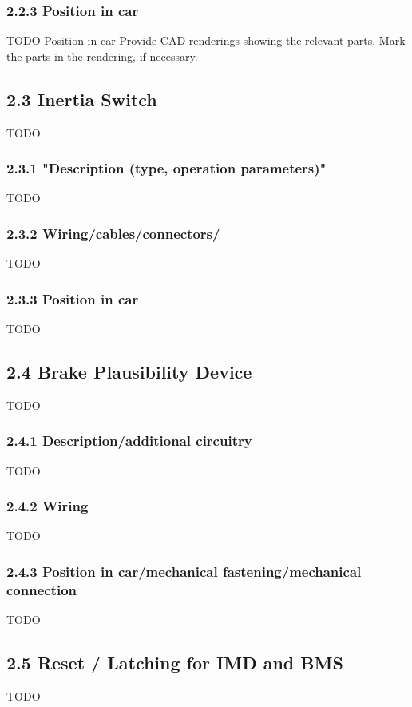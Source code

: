 \documentclass{article}
\begin{document}
\subsubsection*{2.2.3 Position in car}
TODO
Position in car
Provide CAD-renderings showing the relevant parts. Mark the parts in the rendering, if necessary.

\subsection*{2.3 Inertia Switch}
TODO

\subsubsection*{2.3.1 "Description (type, operation parameters)"}
TODO

\subsubsection*{2.3.2 Wiring/cables/connectors/}
TODO

\subsubsection*{2.3.3 Position in car}
TODO

\subsection*{2.4 Brake Plausibility Device}
TODO

\subsubsection*{2.4.1 Description/additional circuitry}
TODO

\subsubsection*{2.4.2 Wiring}
TODO

\subsubsection*{2.4.3 Position in car/mechanical fastening/mechanical connection}
TODO

\subsection*{2.5 Reset / Latching for IMD and BMS}
TODO
\end{document}
